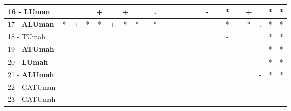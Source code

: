 \begin{table}[h]
\begin{center}
\begin{tabular}{lcc|cc|cc|cc|cc|cc|cc|cc|cc|cc|cc|c}
16 - \textbf{LUman}	&   &   &   & + &   & + &   &   & . &   &   &   &   &   &   & - &   & * &   & + &   & * & * \\ \hline
17 - \textbf{ALUman}	& * & + & * & * & + & * & * &   & * &   &   &   &   &   &   &   & - & * &   & * & . & * & * \\
18 - TUmah	&   &   &   &   &   &   &   &   &   &   &   &   &   &   &   &   &   & - &   &   &   & * & * \\ \hline
19 - \textbf{ATUmah}	&   &   &   &   &   &   &   &   &   &   &   &   &   &   &   &   &   &   & - &   &   & * & * \\
20 - \textbf{LUmah}	&   &   &   &   &   &   &   &   &   &   &   &   &   &   &   &   &   &   &   & - &   & * & * \\ \hline
21 - \textbf{ALUmah}	&   &   &   &   &   &   &   &   &   &   &   &   &   &   &   &   &   &   &   &   & - & * & * \\
22 - GATUman	&   &   &   &   &   &   &   &   &   &   &   &   &   &   &   &   &   &   &   &   &   & - &   \\ \hline
23 - GATUmah	&   &   &   &   &   &   &   &   &   &   &   &   &   &   &   &   &   &   &   &   &   &   & - \\\end{tabular}
\label{stratsALCKappaFriedNB}
\end{center}
\end{table}